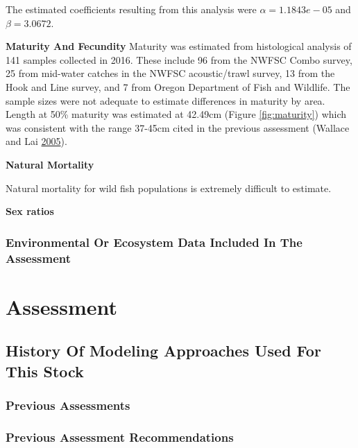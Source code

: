 \documentclass[12pt,]{article}
\begin{document}
The estimated coefficients resulting from this analysis were
\(\alpha = 1.1843e-05\) and \(\beta = 3.0672\).

\vspace{.5cm}

\textbf{Maturity And Fecundity} Maturity was estimated from histological
analysis of 141 samples collected in 2016. These include 96 from the
NWFSC Combo survey, 25 from mid-water catches in the NWFSC
acoustic/trawl survey, 13 from the Hook and Line survey, and 7 from
Oregon Department of Fish and Wildlife. The sample sizes were not
adequate to estimate differences in maturity by area. Length at 50\%
maturity was estimated at 42.49cm (Figure \ref{fig:maturity}) which was
consistent with the range 37-45cm cited in the previous assessment
(Wallace and Lai \protect\hyperlink{ref-Wallace2005}{2005}).

\vspace{.5cm}

\textbf{Natural Mortality}

Natural mortality for wild fish populations is extremely difficult to
estimate.

\vspace{.5cm}

\textbf{Sex ratios}

\subsubsection{Environmental Or Ecosystem Data Included In The
Assessment}\label{environmental-or-ecosystem-data-included-in-the-assessment}

\section{Assessment}\label{assessment}

\subsection{History Of Modeling Approaches Used For This
Stock}\label{history-of-modeling-approaches-used-for-this-stock}

\subsubsection{Previous Assessments}\label{previous-assessments}

\subsubsection{Previous Assessment
Recommendations}\label{previous-assessment-recommendations}
\end{document}
